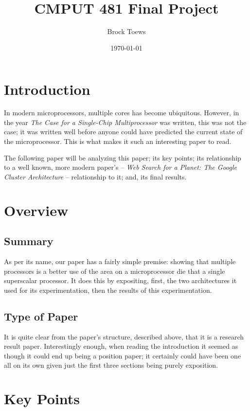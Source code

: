 \documentclass[12pt, twocolumn]{article}
\title{CMPUT 481 Final Project}
\author{Brock Toews}
\date{\today}
\begin{document}
\setcounter{page}{1}
\doublespacing
\section{Introduction}
In modern microprocessors, multiple cores has become ubiquitous. However, in the
year \emph{The Case for a Single-Chip Multiprocessor} was written, this was not
the case; it was written well before anyone could have predicted the current
state of the microprocessor. This is what makes it such an interesting paper to
read.

The following paper will be analyzing this paper; its key points; its
relationship to a well known, more modern paper's -- \emph{Web Search for a 
Planet: The Google Cluster Architecture} -- relationship to it; and, its final
results.
\section{Overview}
\subsection{Summary}
As per its name, our paper has a fairly simple premise: showing that
multiple processors is a better use of the area on a microprocessor die that a
single superscalar processor. It does this by expositing, first, the two
architectures it used for its experimentation, then the results of this
experimentation.
\subsection{Type of Paper}
It is quite clear from the paper's structure, described above, that it is a
research result paper. Interestingly enough, when reading the introduction it
seemed as though it could end up being a position paper; it certainly could 
have been one all on its own given just the first three sections being purely
exposition.
\section{Key Points}
\end{document}
